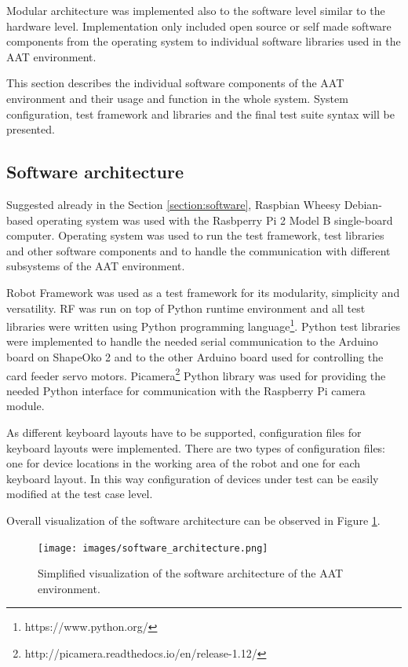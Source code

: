 Modular architecture was implemented also to the software level similar to the hardware level. Implementation only included open source or self made software components from the operating system to individual software libraries used in the AAT environment.

This section describes the individual software components of the AAT environment and their usage and function in the whole system. System configuration, test framework and libraries and the final test suite syntax will be presented.

\subsection{Software architecture}
\label{subsection:Software architecture}

Suggested already in the Section \ref{section:software}, Raspbian Wheesy Debian-based operating system was used with the Rasbperry Pi 2 Model B single-board computer. Operating system was used to run the test framework, test libraries and other software components and to handle the communication with different subsystems of the AAT environment.

Robot Framework was used as a test framework for its modularity, simplicity and versatility. RF was run on top of Python runtime environment and all test libraries were written using Python programming language\footnote{https://www.python.org/}. Python test libraries were implemented to handle the needed serial communication to the Arduino board on ShapeOko 2 and to the other Arduino board used for controlling the card feeder servo motors. Picamera\footnote{http://picamera.readthedocs.io/en/release-1.12/} Python library was used for providing the needed Python interface for communication with the Raspberry Pi camera module.

As different keyboard layouts have to be supported, configuration files for keyboard layouts were implemented. There are two types of configuration files: one for device locations in the working area of the robot and one for each keyboard layout. In this way configuration of devices under test can be easily modified at the test case level.

Overall visualization of the software architecture can be observed in Figure \ref{fig:software_architecture}.

\begin{figure}[ht]
  \begin{center}
    \texttt{[image: images/software\_architecture.png]}
    \caption{Simplified visualization of the software architecture of the AAT environment.}
    \label{fig:software_architecture}
  \end{center}
\end{figure}
\FloatBarrier

